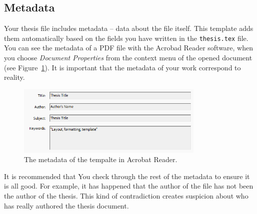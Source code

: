 \subsection{Metadata}
Your thesis file includes metadata – data about the file itself. This template adds them automatically based on the fields you have written in the \verb|thesis.tex| file. You can see the metadata of a PDF file with the Acrobad Reader software, when you choose \emph{Document Properties} from the context menu of the opened document (see Figure~\ref{fig:metadata}). It is important that the metadata of your work correspond to reality.

\begin{figure}[ht]
    \centering
    \includegraphics[width=0.8\textwidth]{figures/Figure4-Metadata.png}
    \caption{The metadata of the tempalte in Acrobat Reader.}
    \label{fig:metadata}
\end{figure}

It is recommended that You check through the rest of the metadata to ensure it is all good. For example, it has happened that the author of the file has not been the author of the thesis. This kind of contradiction creates suspicion about who has really authored the thesis document.
